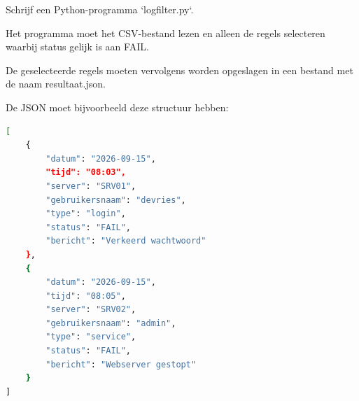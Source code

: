 Schrijf een Python-programma `logfilter.py`.

Het programma moet het CSV-bestand lezen en alleen de regels selecteren waarbij status gelijk is aan FAIL.

De geselecteerde regels moeten vervolgens worden opgeslagen in een bestand met de naam resultaat.json.

De JSON moet bijvoorbeeld deze structuur hebben:

\begin{lstlisting}[language=bash]
[
    {
        "datum": "2026-09-15",
        "tijd": "08:03",
        "server": "SRV01",
        "gebruikersnaam": "devries",
        "type": "login",
        "status": "FAIL",
        "bericht": "Verkeerd wachtwoord"
    },
    {
        "datum": "2026-09-15",
        "tijd": "08:05",
        "server": "SRV02",
        "gebruikersnaam": "admin",
        "type": "service",
        "status": "FAIL",
        "bericht": "Webserver gestopt"
    }
]
\end{lstlisting}

